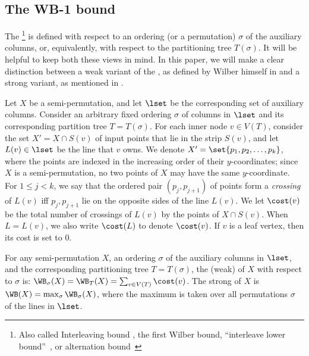 %
%
%
%
%
%
%




%
%
%
\subsection{The WB-1 bound}\label{sec: WB def}
%
%


The \WBone\footnote{Also called Interleaving bound \cite{tango}, the first Wilber bound, ``interleave lower bound''~\cite{wilber}, or alternation bound~\cite{in_pursuit}} is defined with respect to an ordering (or a permutation) $\sigma$ of the auxiliary columns, or,  equivalently, with respect to the partitioning tree $T(\sigma)$. 
It will be helpful to keep both these views in mind. 
In this paper, we will make a clear distinction between a weak variant of the \WBone, as defined by Wilber himself in \cite{wilber} and a strong variant, as mentioned in \cite{in_pursuit}.  

Let $X$ be a semi-permutation, and let $\lset$ be the corresponding set of auxiliary columns. 
Consider an arbitrary fixed ordering $\sigma$ of columns in $\lset$ and its corresponding partition tree $T = T(\sigma)$.   
For each inner node $v \in V(T)$, consider the set $X' = X \cap S(v)$ of input points that lie in the strip $S(v)$, and let $L(v)\in \lset$ be the line that $v$ owns.
We denote $X'=\set{p_1,p_2,\ldots,p_k}$, where the points are indexed in the increasing order of their $y$-coordinates; since $X$ is a semi-permutation, no two points of $X$ may have the same $y$-coordinate. 
For $1\leq j<k$, we say that the ordered pair $(p_j,p_{j+1})$ of points form a \emph{crossing} of $L(v)$ iff $p_j,p_{j+1}$ lie on the opposite sides of the line $L(v)$. 
We let $\cost(v)$ be the total number of crossings of $L(v)$ by the points of $X \cap S(v)$. When $L = L(v)$, we also write $\cost(L)$ to denote $\cost(v)$. If $v$ is a leaf vertex, then its cost is set to $0$.
%


\begin{definition}[\WBone] 
For any semi-permutation $X$, an ordering $\sigma$ of the auxiliary columns in $\lset$, and the corresponding partitioning tree $T=T({\sigma})$,
the (weak) \WBone of $X$ with respect to $\sigma$ is: 
$\WB_{\sigma}(X) =  \WB_{T}(X) = \sum_{v \in V(T)} \cost(v)$.
The strong \WBone of $X$ is $\WB(X) = \max_{\sigma} \WB_{\sigma}(X)$, where the maximum is taken over all permutations $\sigma$ of the lines in $\lset$.  
\end{definition} 




